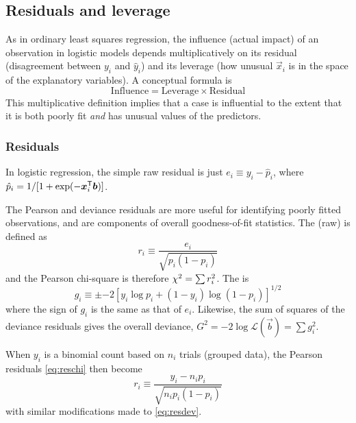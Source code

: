 \documentclass[11pt]{book}\usepackage[]{graphicx}\usepackage[]{color}
\begin{document}
\subsection{Residuals and leverage}\label{sec:logist-resids}
As in ordinary least squares regression, the influence (actual impact)
of an observation in logistic models depends multiplicatively
on its residual (disagreement between $y_i$ and $\hat{y}_i$)
and its leverage (how unusual $\vec{x}_i$ is in the space of the
explanatory variables).
A conceptual formula is
\begin{equation*}
  \mathrm{Influence} = \mathrm{Leverage} \times \mathrm{Residual}
\end{equation*}
This multiplicative definition implies that a case is influential to
the extent that it is both poorly fit \emph{and} has unusual values of
the predictors.

\subsubsection{Residuals}
In logistic regression, the simple raw residual is just $e_i \equiv y_i - \hat{p}_i$,
where 
$ \hat{p}_i = 1 / [1 + \exp(- \bm{x}_i^\mathsf{T} \bm{b} )]$.

The  Pearson and deviance residuals are more useful for identifying
poorly fitted observations, and are components of overall goodness-of-fit
statistics.
The (raw)  is defined as
\begin{equation}\label{eq:reschi}
r_i \equiv \frac{e_i}{\sqrt{ p_i  (1-p_i)}}
\end{equation}
and the Pearson chi-square is therefore $\chi^2 = \sum r_i^2$.
The  is
\begin{equation}\label{eq:resdev}
g_i \equiv \pm { -2 [ y_i \log p_i  + (1-y_i) \log (1-p_i) ] }^{1/2}
\end{equation}
where the sign of $g_i$ is the same as that of $e_i$.
Likewise, the sum of squares of the deviance residuals gives
the overall deviance,
$G^2 = -2 \log \mathcal{L}(\vec{b}) = \sum g_i^2$.

When $y_i$ is a binomial count based on $n_i$ trials (grouped data),
the Pearson residuals \eqref{eq:reschi} then become
\begin{equation*}%
r_i \equiv \frac{y_i -n_i p_i}{\sqrt{n_i  p_i  (1-p_i)}}
\end{equation*}
with similar modifications made to \eqref{eq:resdev}.
\end{document}
